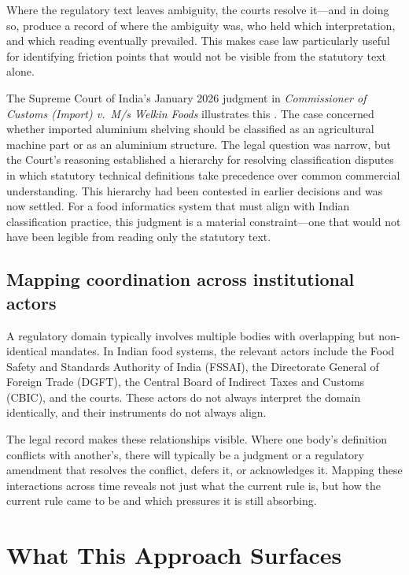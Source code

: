 \documentclass[12pt,a4paper]{article}
\begin{document}
Where the regulatory text leaves ambiguity, the courts resolve it---and in doing
so, produce a record of where the ambiguity was, who held which interpretation, and
which reading eventually prevailed. This makes case law particularly useful for
identifying friction points that would not be visible from the statutory text alone.

The Supreme Court of India's January 2026 judgment in \textit{Commissioner of
Customs (Import) v.\ M/s Welkin Foods} illustrates this \cite{ifid:sc2026}. The
case concerned whether imported aluminium shelving should be classified as an
agricultural machine part or as an aluminium structure. The legal question was
narrow, but the Court's reasoning established a hierarchy for resolving
classification disputes in which statutory technical definitions take precedence
over common commercial understanding. This hierarchy had been contested in earlier
decisions and was now settled. For a food informatics system that must align with
Indian classification practice, this judgment is a material constraint---one that
would not have been legible from reading only the statutory text.

\subsection{Mapping coordination across institutional actors}

A regulatory domain typically involves multiple bodies with overlapping but
non-identical mandates. In Indian food systems, the relevant actors include the
Food Safety and Standards Authority of India (FSSAI), the Directorate General of
Foreign Trade (DGFT), the Central Board of Indirect Taxes and Customs (CBIC), and
the courts. These actors do not always interpret the domain identically, and their
instruments do not always align.

The legal record makes these relationships visible. Where one body's definition
conflicts with another's, there will typically be a judgment or a regulatory
amendment that resolves the conflict, defers it, or acknowledges it. Mapping these
interactions across time reveals not just what the current rule is, but how the
current rule came to be and which pressures it is still absorbing.

\section{What This Approach Surfaces}
\end{document}
